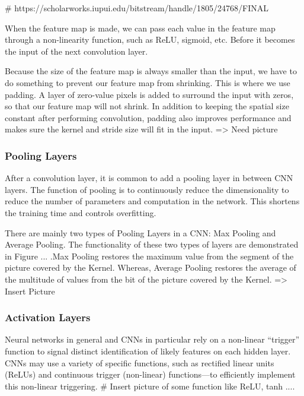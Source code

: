         # https://scholarworks.iupui.edu/bitstream/handle/1805/24768/FINAL%

        When the feature map is made, we can pass each value in
        the feature map through a non-linearity function, such as ReLU, sigmoid, etc. Before it
        becomes the input of the next convolution layer.

        Because the size of the feature map is always smaller than the input, we have 
        to do something to prevent our feature map from shrinking. This is where we use 
        padding. A layer of zero-value pixels is added to surround the input with zeros, 
        so that our feature map will not shrink. In addition to keeping the spatial 
        size constant after performing convolution, padding also improves performance 
        and makes sure the kernel and stride size will fit in the input. => Need picture
      \subsubsection{ Pooling Layers }
        After a convolution layer, it is common to add a pooling layer in between CNN layers. 
        The function of pooling is to continuously reduce the dimensionality to reduce the number 
        of parameters and computation in the network. This shortens the training time and controls 
        overfitting.

        There are mainly two types of Pooling Layers in a CNN: Max Pooling and Average
        Pooling. The functionality of these two types of layers are demonstrated in Figure
        ... .Max Pooling restores the maximum value from the segment of the picture covered
        by the Kernel. Whereas, Average Pooling restores the average of the multitude of
        values from the bit of the picture covered by the Kernel. => Insert Picture

      \subsubsection{ Activation Layers }
        Neural networks in general and CNNs in particular rely on a non-linear “trigger” function 
        to signal distinct identification of likely features on each hidden layer. CNNs may use a 
        variety of specific functions, such as rectified linear
        units (ReLUs) and continuous trigger (non-linear) functions—to efficiently implement this non-linear triggering.
        # Insert picture of some function like ReLU, tanh ....
